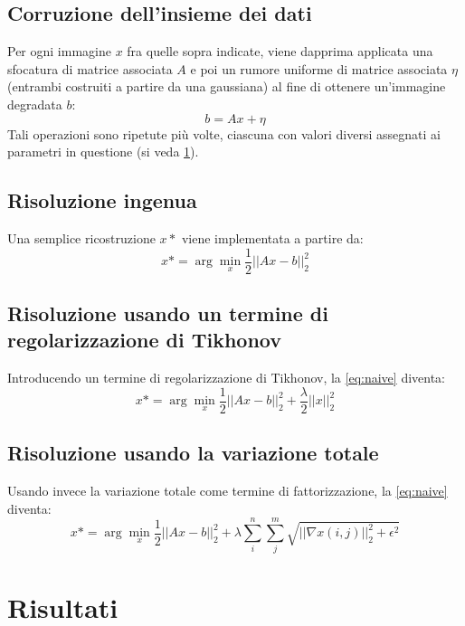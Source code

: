 \documentclass[a4paper]{article}
\begin{document}
\subsection{Corruzione dell'insieme dei dati}
Per ogni immagine $x$ fra quelle sopra indicate, viene dapprima applicata una
sfocatura di matrice associata $A$ e poi un rumore uniforme di matrice associata
$\eta$ (entrambi costruiti a partire da una gaussiana) al fine di ottenere
un'immagine degradata $b$:
\begin{equation}
  b = Ax + \eta
\end{equation}
Tali operazioni sono ripetute più volte, ciascuna con valori diversi assegnati
ai parametri in questione (si veda \ref{results}).

\subsection{Risoluzione ingenua}
Una semplice ricostruzione $x*$ viene implementata a partire da:
\begin{equation}\label{eq:naive}
  x* = \arg \min_{x} \frac{1}{2}||Ax - b||^2_2
\end{equation}

\subsection{Risoluzione usando un termine di regolarizzazione di Tikhonov}
Introducendo un termine di regolarizzazione di Tikhonov, la \ref{eq:naive}
diventa:
\begin{equation}
  x* = \arg \min_{x} \frac{1}{2}||Ax - b||^2_2 + \frac{\lambda}{2}||x||^2_2
\end{equation}

\subsection{Risoluzione usando la variazione totale}
Usando invece la variazione totale come termine di fattorizzazione, la
\ref{eq:naive} diventa:
\begin{equation}
  x* = \arg \min_{x} \frac{1}{2}||Ax - b||^2_2 +
  \lambda\sum_i^n\sum_j^m\sqrt{||\nabla x(i,j)||_2^2+\epsilon^2}
\end{equation}

\section{Risultati} \label{results}
\end{document}
